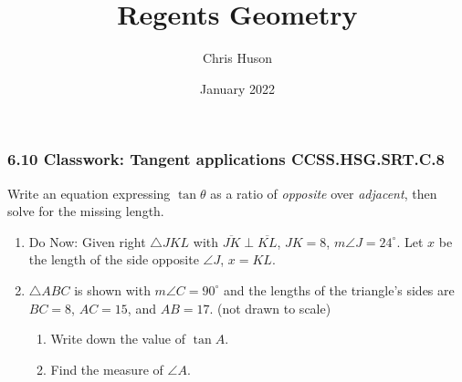 \documentclass[12pt, twoside]{article}
\title{Regents Geometry}
\author{Chris Huson}
\date{January 2022}
\begin{document}
\subsubsection*{6.10 Classwork: Tangent applications \hfill CCSS.HSG.SRT.C.8}
Write an equation expressing $\tan \theta$ as a ratio of \emph{opposite} over \emph{adjacent}, then solve for the missing length.
\begin{enumerate}
\item Do Now: Given right $\triangle JKL$ with $\overline{JK} \perp \overline{KL}$, $JK=8$, $m\angle J=24^\circ$. Let $x$ be the length of the side opposite $\angle J$, $x=KL$.
    \begin{flushright}
      \end{flushright} \vspace{1.5cm}

\item $\triangle ABC$ is shown with $m\angle C=90^\circ$ and the lengths of the triangle's sides are $BC=8$, $AC=15$, and $AB=17$.  \hfill (not drawn to scale)
\begin{multicols}{2}
      \begin{enumerate}
      \item Write down the value of $\tan A$. \vspace{1.25cm}
      \item Find the measure of $\angle A$.  \vspace{1cm}
    \end{enumerate}
  \end{multicols} %


\end{enumerate}
\end{document}
